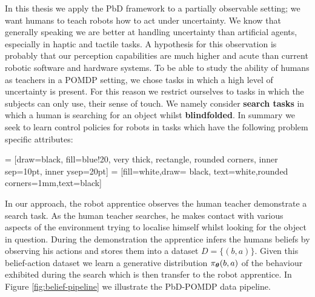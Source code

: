 In this thesis we apply the PbD framework to a partially observable setting; we want humans to teach robots how to act under uncertainty.
We know that generally speaking we are better at handling uncertainty than artificial agents, especially in haptic and tactile tasks. 
A hypothesis for this observation is probably that our perception capabilities are much higher and acute than 
current robotic software and hardware systems.
To be able to study the ability of humans as teachers in a POMDP setting, we chose tasks in which a high level of uncertainty is present. For 
this reason we restrict ourselves to tasks in which the subjects can only use, their sense of touch. We namely consider \textbf{search tasks} in 
which a human is searching for an object whilst \textbf{blindfolded}. In summary we seek to learn control policies for robots in 
tasks which have the following problem specific attributes:

  = [draw=black, fill=blue!20, very thick,  rectangle, rounded corners, inner sep=10pt, inner ysep=20pt]
 = [fill=white,draw= black, text=white,rounded corners=1mm,text=black]

\begin{center}
\end{center}

In our approach, the robot apprentice observes the human teacher demonstrate a search task. As the human teacher searches, he makes contact with 
various aspects of the environment trying to localise himself whilst looking for the object in question. During the demonstration the apprentice 
infers the humans beliefs by observing his actions and stores them into a dataset $D = \{(b,a)\}$. Given this belief-action dataset we learn a 
generative distribution $\operatorname{\pi_{\boldsymbol{\theta}}}(b,a)$ of the behaviour exhibited during the search which is then transfer to the robot apprentice.  In Figure
\ref{fig:belief-pipeline} we illustrate the PbD-POMDP data pipeline.

